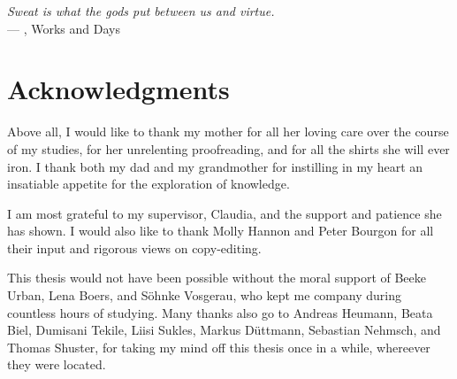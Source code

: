 
\begin{flushright}{\slshape    
    Sweat is what the gods put between us and virtue.} \\ \medskip
    --- , Works and Days
\end{flushright}



\bigskip

\begingroup
\let\clearpage\relax
\let\cleardoublepage\relax
\let\cleardoublepage\relax
\chapter*{Acknowledgments}

Above all, I would like to thank my mother for all her loving care over the course of my studies, for her unrelenting proofreading, and for all the shirts she will ever iron.
I thank both my dad and my grandmother for instilling in my heart an insatiable appetite for the exploration of knowledge. 

I am most grateful to my supervisor, Claudia, and the support and patience she has shown.
I would also like to thank Molly Hannon and Peter Bourgon for all their input and rigorous views on copy-editing.

This thesis would not have been possible without the moral support of Beeke Urban, Lena Boers, and S\"ohnke Vosgerau, who kept me company during countless hours of studying.
Many thanks also go to Andreas Heumann, Beata Biel, Dumisani Tekile, Liisi Sukles, Markus D\"uttmann, Sebastian Nehmsch, and Thomas Shuster, for taking my mind off this thesis once in a while,  whereever they were located.
\endgroup



